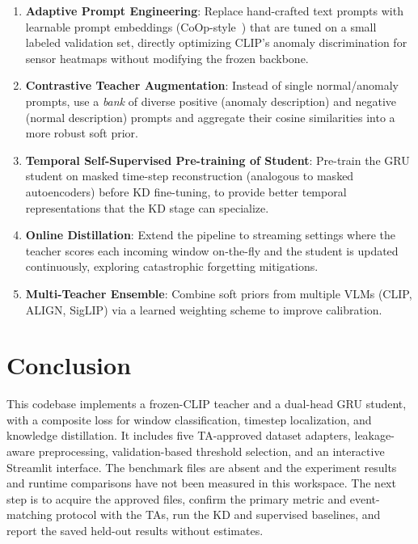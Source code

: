 \documentclass[10pt,twocolumn]{article}
\begin{document}
\begin{enumerate}[leftmargin=*, topsep=2pt, itemsep=4pt]
    \item \textbf{Adaptive Prompt Engineering}: Replace hand-crafted text prompts with learnable prompt embeddings (CoOp-style~\cite{zhou2022coop}) that are tuned on a small labeled validation set, directly optimizing CLIP's anomaly discrimination for sensor heatmaps without modifying the frozen backbone.

    \item \textbf{Contrastive Teacher Augmentation}: Instead of single normal/anomaly prompts, use a \textit{bank} of diverse positive (anomaly description) and negative (normal description) prompts and aggregate their cosine similarities into a more robust soft prior.

    \item \textbf{Temporal Self-Supervised Pre-training of Student}: Pre-train the GRU student on masked time-step reconstruction (analogous to masked autoencoders) before KD fine-tuning, to provide better temporal representations that the KD stage can specialize.

    \item \textbf{Online Distillation}: Extend the pipeline to streaming settings where the teacher scores each incoming window on-the-fly and the student is updated continuously, exploring catastrophic forgetting mitigations.

    \item \textbf{Multi-Teacher Ensemble}: Combine soft priors from multiple VLMs (CLIP, ALIGN, SigLIP) via a learned weighting scheme to improve calibration.
\end{enumerate}

\section{Conclusion}

This codebase implements a frozen-CLIP teacher and a dual-head GRU student, with a composite loss for window classification, timestep localization, and knowledge distillation. It includes five TA-approved dataset adapters, leakage-aware preprocessing, validation-based threshold selection, and an interactive Streamlit interface. The benchmark files are absent and the experiment results and runtime comparisons have not been measured in this workspace. The next step is to acquire the approved files, confirm the primary metric and event-matching protocol with the TAs, run the KD and supervised baselines, and report the saved held-out results without estimates.
\end{document}
